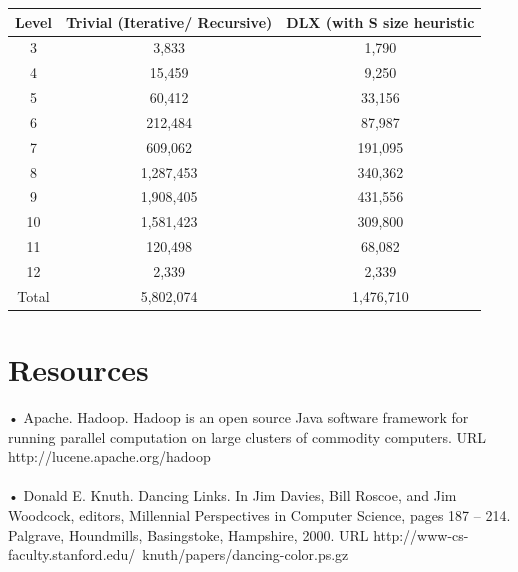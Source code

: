 \documentclass[a4paper,twoside,10pt]{report}
\begin{document}
\begin{tabular}{|c|c|c|}
\hline Level & Trivial (Iterative/ Recursive) & DLX (with S size heuristic \\
\hline 3 & 3,833 & 1,790 \\
\hline 4 & 15,459 & 9,250 \\
\hline 5 & 60,412 & 33,156 \\
\hline 6 & 212,484 & 87,987 \\
\hline 7 & 609,062 & 191,095 \\
\hline 8 & 1,287,453 & 340,362 \\
\hline 9 & 1,908,405 & 431,556 \\
\hline 10 & 1,581,423 & 309,800 \\
\hline 11 & 120,498 & 68,082 \\
\hline 12 & 2,339 & 2,339 \\
\hline Total & 5,802,074 & 1,476,710 \\
\hline
\end{tabular}

\chapter{Resources}\label{Resources}

•	Apache. Hadoop. Hadoop is an open source Java software framework for running parallel computation on large clusters of commodity computers.
URL http://lucene.apache.org/hadoop
\\
\\
•	Donald E. Knuth. Dancing Links. In Jim Davies, Bill Roscoe, and Jim Woodcock, editors, Millennial Perspectives in Computer Science, pages 187 – 214. Palgrave, Houndmills, Basingstoke, Hampshire, 2000.
URL http://www-cs-faculty.stanford.edu/~knuth/papers/dancing-color.ps.gz







\clearpage
{}
\listoffigures

\appendix

\end{document}
